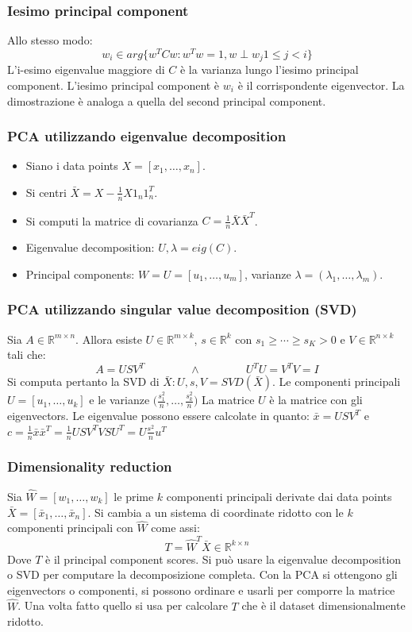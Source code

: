 		\subsubsection{Iesimo principal component}
		Allo stesso modo:
		$$w_i\in arg\{w^TCw:w^Tw=1,w\perp w_j 1\le j < i\}$$
		L'i-esimo eigenvalue maggiore di $C$ \`e la varianza lungo l'iesimo principal component.
		L'iesimo principal component \`e $w_i$ \`e il corrispondente eigenvector.
		La dimostrazione \`e analoga a quella del second principal component.
		
		\subsubsection{PCA utilizzando eigenvalue decomposition}
		\begin{itemize}
			\item Siano i data points $X=[x_1,\dots,x_n]$.
			\item Si centri $\bar{X} = X-\frac{1}{n}X1_n1_n^T$.
			\item Si computi la matrice di covarianza $C=\frac{1}{n}\bar{X}\bar{X}^T$.
			\item Eigenvalue decomposition: $U,\lambda = eig(C)$.
			\item Principal components: $W=U=[u_1,\dots,u_m]$, varianze $\lambda = (\lambda_1,\dots,\lambda_m)$.
		\end{itemize}
		
		\subsubsection{PCA utilizzando singular value decomposition (SVD)}
		Sia $A\in\mathbb{R}^{m\times n}$.
		Allora esiste $U\in\mathbb{R}^{m\times k}$, $s\in\mathbb{R}^k$ con $s_1\ge\cdots\ge s_K >0$ e $V\in \mathbb{R}^{n\times k}$ tali che:
		$$A = USV^T\qquad\qquad\land\qquad\qquad U^TU=V^TV=I$$
		Si computa pertanto la SVD di $\bar{X}:U,s,V=SVD(\bar{X})$.
		Le componenti principali $U=[u_1,\dots,u_k]$ e le varianze $\bigl(\frac{s_1^2}{n},\dots,\frac{s_k^2}{n}\bigr)$
		La matrice $U$ \`e la matrice con gli eigenvectors.
		Le eigenvalue possono essere calcolate in quanto: $\bar{x} = USV^T$ e $c = \frac{1}{n}\bar{x}\bar{x}^T = \frac{1}{n}USV^TVSU^T=U\frac{s^2}{n}u^T$
		
		\subsubsection{Dimensionality reduction}
		Sia $\hat{W} = [w_1,\dots,w_k]$ le prime $k$ componenti principali derivate dai data points $\bar{X} = [\bar{x}_1,\dots,\bar{x}_n]$.
		Si cambia a un sistema di coordinate ridotto con le $k$ componenti principali con $\hat{W}$ come assi:
		$$T = \hat{W}^T\bar{X}\in\mathbb{R}^{k\times n}$$
		Dove $T$ \`e il principal component scores.
		Si pu\`o usare la eigenvalue decomposition o SVD per computare la decomposizione completa.
		Con la PCA si ottengono gli eigenvectors o componenti, si possono ordinare e usarli per comporre la matrice $\hat{W}$.
		Una volta fatto quello si usa per calcolare $T$ che \`e il dataset dimensionalmente ridotto.
		
